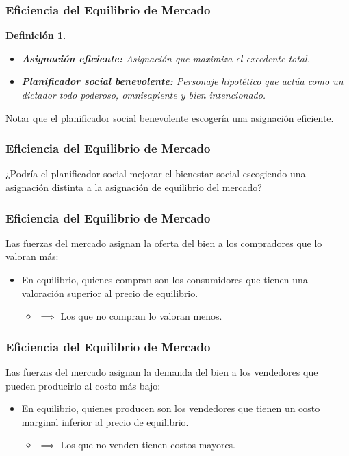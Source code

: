 \documentclass[dvipsnames,table,leqno]{beamer}
\newtheorem{mydef}{Definición}
\begin{document}
		\begin{frame}
			\frametitle{Eficiencia del Equilibrio de Mercado}
			\begin{mydef}
				\begin{itemize}
					\item \textbf{Asignación eficiente:} Asignación que maximiza el excedente total.
					\item \textbf{Planificador social benevolente:} Personaje hipotético que actúa como un dictador todo poderoso, omnisapiente y bien intencionado.
				\end{itemize}
			\end{mydef}
			Notar que el planificador social benevolente escogería una asignación eficiente.
		\end{frame}

		\begin{frame}
			\frametitle{Eficiencia del Equilibrio de Mercado}
			¿Podría el planificador social mejorar el bienestar social escogiendo una asignación distinta a la asignación de equilibrio del mercado?
		\end{frame}

		\begin{frame}
			\frametitle{Eficiencia del Equilibrio de Mercado}
			Las fuerzas del mercado asignan la oferta del bien a los compradores que lo valoran más:
				\begin{itemize}
					\item En equilibrio, quienes compran son los consumidores que tienen una valoración superior al precio de equilibrio. 
						\begin{itemize}
							\item $\implies$ Los que no compran lo valoran menos.
						\end{itemize}
				\end{itemize}
		\end{frame}

		\begin{frame}
			\frametitle{Eficiencia del Equilibrio de Mercado}
			Las fuerzas del mercado asignan la demanda del bien a los vendedores que pueden producirlo al costo más bajo:
				\begin{itemize}
					\item En equilibrio, quienes producen son los vendedores que tienen un costo marginal inferior al precio de equilibrio. 
						\begin{itemize}
							\item $\implies$ Los que no venden tienen costos mayores.
						\end{itemize}
				\end{itemize}
		\end{frame}
	
\end{document}
